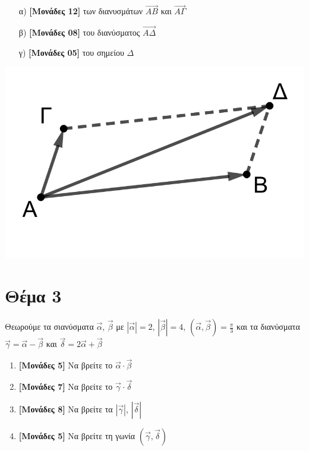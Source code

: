 \documentclass[12pt]{article}
\begin{document}
\begin{enumerate}
 \item [α)] \textbf{[Μονάδες 12]} των διανυσμάτων $\overrightarrow{ΑΒ}$ και $\overrightarrow{ΑΓ}$
 \item [β)] \textbf{[Μονάδες 08]} του διανύσματος $\overrightarrow{ΑΔ}$
 \item [γ)] \textbf{[Μονάδες 05]} του σημείου $Δ$
\end{enumerate}
\includegraphics[scale=0.25]{"2022.png"}

\section*{Θέμα 3}
\noindent
Θεωρούμε τα σιανύσματα $\vec{α}$, $\vec{β}$ με $|\vec{α}|=2$, $|\vec{β}|=4$, $(\vec{α},\vec{β})=\frac{π}{3}$ και τα διανύσματα $\vec{γ}=\vec{α}-\vec{β}$ και $\vec{δ}=2\vec{α}+\vec{β}$
\begin{enumerate}
 \item \textbf{[Μονάδες 5]} Να βρείτε το $\vec{α}\cdot\vec{β}$
 \item \textbf{[Μονάδες 7]} Να βρείτε το $\vec{γ}\cdot\vec{δ}$
 \item \textbf{[Μονάδες 8]} Να βρείτε τα $|\vec{γ}|$, $|\vec{δ}|$
 \item \textbf{[Μονάδες 5]} Να βρείτε τη γωνία $(\vec{γ},\vec{δ})$
\end{enumerate}
\end{document}
